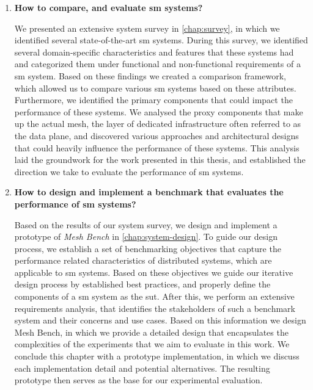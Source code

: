 \begin{enumerate}[label=\textbf{RQ\arabic*}, leftmargin=3\parindent]
    \item \textbf{How to compare, and evaluate \gls{sm} systems?}
    \label{rq-1:ans}
    
    We presented an extensive system survey in \cref{chap:survey}, in which we identified several state-of-the-art \gls{sm} systems. During this survey, we identified several domain-specific characteristics and features that these systems had and categorized them under functional and non-functional requirements of a \gls{sm} system. Based on these findings we created a comparison framework, which allowed us to compare various \gls{sm} systems based on these attributes. Furthermore, we identified the primary components that could impact the performance of these systems. We analysed the proxy components that make up the actual mesh, the layer of dedicated infrastructure often referred to as the data plane, and discovered various approaches and architectural designs that could heavily influence the performance of these systems. This analysis laid the groundwork for the work presented in this thesis, and established the direction we take to evaluate the performance of \gls{sm} systems.

    
    \item \textbf{How to design and implement a benchmark that evaluates the performance of \gls{sm} systems?}
    \label{rq-2:ans}
    
    Based on the results of our system survey, we design and implement a prototype of \textit{Mesh Bench} in \cref{chap:system-design}. To guide our design process, we establish a set of benchmarking objectives that capture the performance related characteristics of distributed systems, which are applicable to \gls{sm} systems. Based on these objectives we guide our iterative design process by established best practices, and properly define the components of a \gls{sm} system as the \gls{sut}. After this, we perform an extensive requirements analysis, that identifies the stakeholders of such a benchmark system and their concerns and use cases. Based on this information we design Mesh Bench, in which we provide a detailed design that encapsulates the complexities of the experiments that we aim to evaluate in this work. We conclude this chapter with a prototype implementation, in which we discuss each implementation detail and potential alternatives. The resulting prototype then serves as the base for our experimental evaluation.
    

\end{enumerate}
